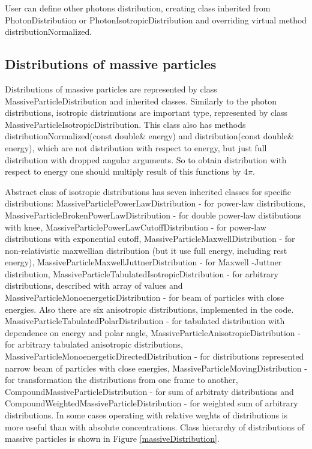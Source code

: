 User can define other photons distribution, creating class inherited from PhotonDistribution or PhotonIsotropicDistribution and overriding virtual method distributionNormalized.


\subsection{Distributions of massive particles}
Distributions of massive particles are represented by class MassiveParticleDistribution and inherited classes. Similarly to the photon distributions, isotropic distrinutions are important type, represented by class
MassiveParticleIsotropicDistribution. This class also has methods distributionNormalized(const double\& energy) and distribution(const double\& energy), which are not distribution with respect to energy, but just full distribution with dropped angular arguments. So to obtain distribution with respect to energy one should multiply result of this functions by $4\pi$.

Abstract class of isotropic distributions has seven inherited classes for specific distributions: MassiveParticlePowerLawDistribution - for power-law distributions, MassiveParticleBrokenPowerLawDistribution - for double power-law distibutions with knee, MassiveParticlePowerLawCutoffDistribution - for power-law distributions with exponential cutoff, MassiveParticleMaxwellDistribution - for non-relativistic maxwellian distribution (but it use full energy, including rest energy), MassiveParticleMaxwellJuttnerDistribution - for Maxwell
-Juttner distribution, MassiveParticleTabulatedIsotropicDistribution - for arbitrary distributions, described with array of values and MassiveParticleMonoenergeticDistribution - for beam of particles with close energies. Also there are six anisotropic distributions, implemented in the code. MassiveParticleTabulatedPolarDistribution - for tabulated distribution with dependence on energy and polar angle, MassiveParticleAnisotropicDistribution - for arbitrary tabulated anisotropic distributions, MassiveParticleMonoenergeticDirectedDistribution - for distributions represented narrow beam of particles with close energies, MassiveParticleMovingDistribution - for transformation the distributions from one frame to another, CompoundMassiveParticleDistribution - for sum of arbitraty distributions and CompoundWeightedMassiveParticleDistribution - for weighted sum of arbitrary distributions. In some cases operating with relative weghts of distributions is more useful than with absolute concentrations. Class hierarchy of distributions of massive particles is shown in Figure \ref{massiveDistribution}.


